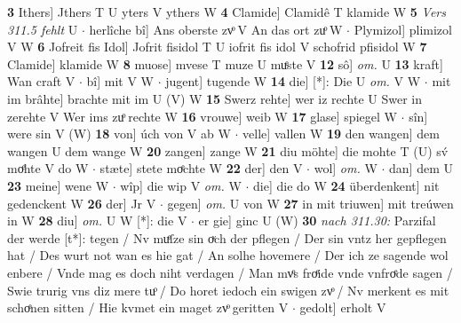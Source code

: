 \documentclass[8pt,a4paper,notitlepage]{article}
\begin{document}
\begin{table}[ht]
\begin{minipage}[t]{0.5\linewidth}
\textbf{3} Ithers] Jthers T U yters V ythers W \textbf{4} Clamide] Clamidê T klamide W \textbf{5} \textit{Vers 311.5 fehlt} U   $\cdot$ herlîche bî] Ans oberste zvͦ V An das ort zuͦ W  $\cdot$ Plymizol] plimizol V W \textbf{6} Jofreit fis Idol] Jofrit fisidol T U iofrit fis idol V schofrid pfisidol W \textbf{7} Clamide] klamide W \textbf{8} muose] mvese T muze U muͤste V \textbf{12} sô] \textit{om.} U \textbf{13} kraft] Wan craft V  $\cdot$ bî] mit V W  $\cdot$ jugent] tugende W \textbf{14} die] [*]: Die U \textit{om.} V W  $\cdot$ mit im brâhte] brachte mit im U (V) W \textbf{15} Swerz rehte] wer iz rechte U Swer in zerehte V Wer ims zuͦ rechte W \textbf{16} vrouwe] weib W \textbf{17} glase] spiegel W  $\cdot$ sîn] were sin V (W) \textbf{18} von] úch von V ab W  $\cdot$ velle] vallen W \textbf{19} den wangen] dem wangen U dem wange W \textbf{20} zangen] zange W \textbf{21} diu möhte] die mohte T (U) sv́ moͤhte V do W  $\cdot$ stæte] stete moͤchte W \textbf{22} der] den V  $\cdot$ wol] \textit{om.} W  $\cdot$ dan] dem U \textbf{23} meine] wene W  $\cdot$ wîp] die wip V \textit{om.} W  $\cdot$ die] die do W \textbf{24} überdenkent] nit gedenckent W \textbf{26} der] Jr V  $\cdot$ gegen] \textit{om.} U von W \textbf{27} in mit triuwen] mit treúwen in W \textbf{28} diu] \textit{om.} U W [*]: die V  $\cdot$ er gie] ginc U (W) \textbf{30} \textit{nach 311.30:} Parzifal der werde [t*]: tegen / Nv muͤſze sin oͮch der pflegen / Der sin vntz her gepflegen hat / Des wurt not wan es hie gat / An solhe hovemere / Der ich ze sagende wol enbere / Vnde mag es doch niht verdagen / Man mvͦs froͤide vnde vnfroͤde sagen / Swie trurig vns diz mere tuͦ / Do horet iedoch ein swigen zvͦ / Nv merkent es mit schoͤnen sitten / Hie kvmet ein maget zvͦ geritten V   $\cdot$ gedolt] erholt V \newline
\end{minipage}
\end{table}
\end{document}
